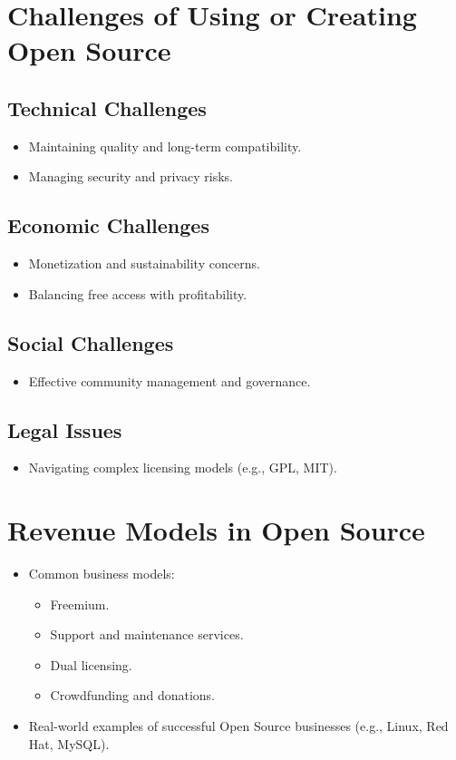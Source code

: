 \section{Challenges of Using or Creating Open Source}
\subsection{Technical Challenges}

\begin{itemize}
    \item Maintaining quality and long-term compatibility.
    \item Managing security and privacy risks.
\end{itemize}
\subsection{Economic Challenges}

\begin{itemize}
    \item Monetization and sustainability concerns.
    \item Balancing free access with profitability.
\end{itemize}
\subsection{Social Challenges}

\begin{itemize}
    \item Effective community management and governance.
\end{itemize}
\subsection{Legal Issues}

\begin{itemize}
    \item Navigating complex licensing models (e.g., GPL, MIT).
\end{itemize}

\section{Revenue Models in Open Source}

\begin{itemize}
    \item Common business models:
    \begin{itemize}
        \item Freemium.
        \item Support and maintenance services.
        \item Dual licensing.
        \item Crowdfunding and donations.
    \end{itemize}
    \item Real-world examples of successful Open Source businesses (e.g., Linux, Red Hat, MySQL).
\end{itemize}

